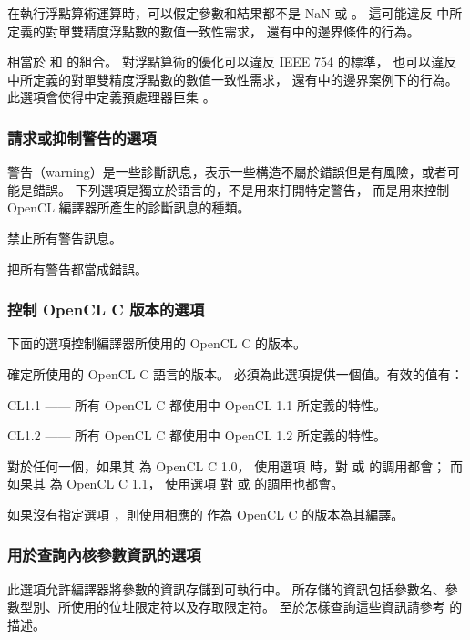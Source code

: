 在執行浮點算術運算時，可以假定參數和結果都不是 NaN 或 \math{\pm\infty}。
這可能違反 中所定義的對單雙精度浮點數的數值一致性需求，
還有中的邊界條件的行為。
\stopclOption

相當於  和  的組合。
對浮點算術的優化可以違反 IEEE 754 的標準，
也可以違反 中所定義的對單雙精度浮點數的數值一致性需求，
還有中的邊界案例下的行為。
此選項會使得中定義預處理器巨集 。
\stopclOption

\subsubsection{請求或抑制警告的選項}

警告（warning）是一些診斷訊息，表示一些構造不屬於錯誤但是有風險，或者可能是錯誤。
下列選項是獨立於語言的，不是用來打開特定警告，
而是用來控制 OpenCL 編譯器所產生的診斷訊息的種類。

禁止所有警告訊息。
\stopclOption

把所有警告都當成錯誤。
\stopclOption

\subsubsection[sec:ctrlcveroption]{控制 OpenCL C 版本的選項}

下面的選項控制編譯器所使用的 OpenCL C 的版本。

確定所使用的 OpenCL C 語言的版本。
必須為此選項提供一個值。有效的值有：
\startigBase
\item CL1.1 —— 所有 OpenCL C 都使用中 OpenCL 1.1 所定義的特性。
\item CL1.2 —— 所有 OpenCL C 都使用中 OpenCL 1.2 所定義的特性。
\stopigBase
\stopclOption

對於任何一個，如果其  為 OpenCL C 1.0，
使用選項  時，對  或  的調用都會{}；
而如果其  為 OpenCL C 1.1，
使用選項  對  或  的調用也都會{}。

如果沒有指定選項 ，則使用相應的  作為 OpenCL C 的版本為其編譯。

\subsubsection{用於查詢內核參數資訊的選項}

此選項允許編譯器將參數的資訊存儲到可執行中。
所存儲的資訊包括參數名、參數型別、所使用的位址限定符以及存取限定符。
至於怎樣查詢這些資訊請參考  的描述。
\stopclOption

